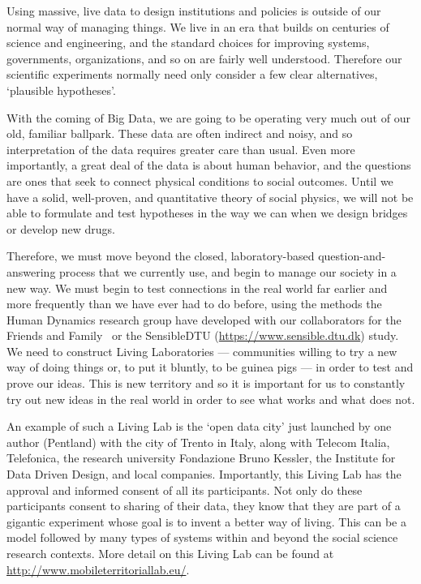 Using massive, live data to design institutions and policies is outside of our normal way of managing things.
We live in an era that builds on centuries of science and engineering, and the standard choices for improving systems, governments, organizations, and so on are fairly well understood. 
Therefore our scientific experiments normally need only consider a few clear alternatives, `plausible hypotheses'.

With the coming of Big Data, we are going to be operating very much out of our old, familiar ballpark.
These data are often indirect and noisy, and so interpretation of the data requires greater care than usual.
Even more importantly, a great deal of the data is about human behavior, and the questions are ones that seek to connect physical conditions to social outcomes.
Until we have a solid, well-proven, and quantitative theory of social physics, we will not be able to formulate and test hypotheses in the way we can when we design bridges or develop new drugs.

Therefore, we must move beyond the closed, laboratory-based question-and-answering process that we currently use, and begin to manage our society in a new way.
We must begin to test connections in the real world far earlier and more frequently than we have ever had to do before, using the methods the Human Dynamics research group have developed with our collaborators for the Friends and Family~\cite{aharony2011social} or the SensibleDTU (\url{https://www.sensible.dtu.dk}) study. 
We need to construct Living Laboratories --- communities willing to try a new way of doing things or, to put it bluntly, to be guinea pigs --- in order to test and prove our ideas.
This is new territory and so it is important for us to constantly try out new ideas in the real world in order to see what works and what does not.

An example of such a Living Lab is the `open data city' just launched by one author (Pentland) with the city of Trento in Italy, along with Telecom Italia, Telefonica, the research university Fondazione Bruno Kessler, the Institute for Data Driven Design, and local companies.
Importantly, this Living Lab has the approval and informed consent of all its participants.  Not only do these participants consent to sharing of their data, they know that they are part of a gigantic experiment whose goal is to invent a better way of living.  This can be a model followed by many types of systems within and beyond the social science research contexts.  
More detail on this Living Lab can be found at \url{http://www.mobileterritoriallab.eu/}.


